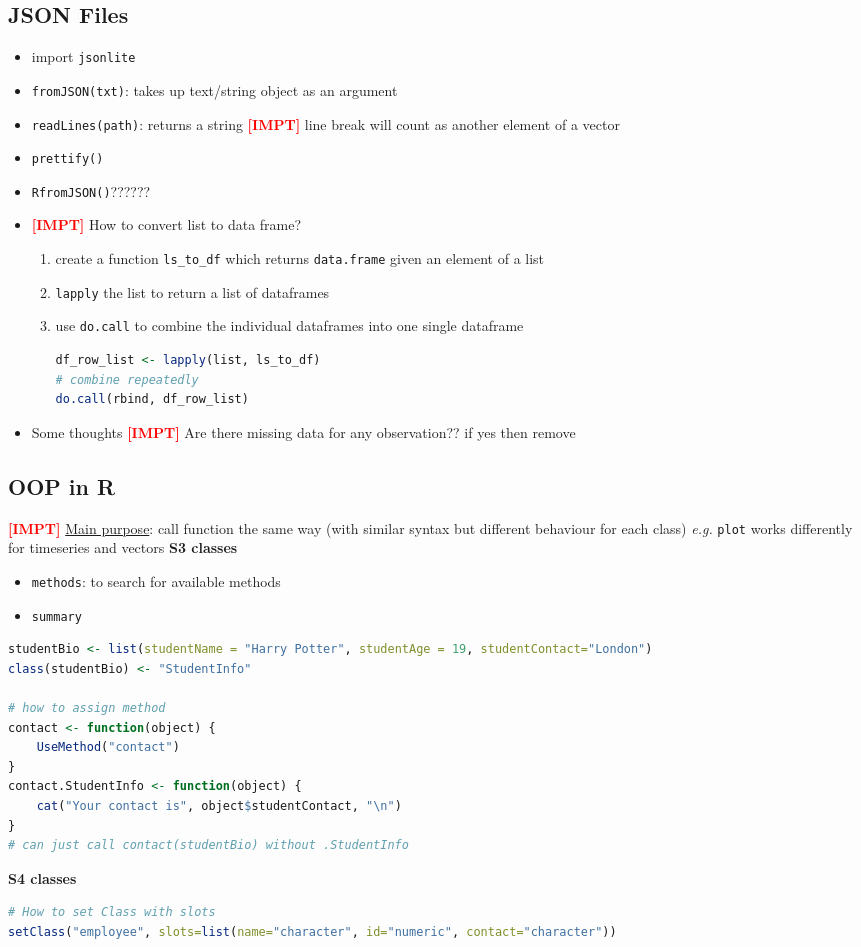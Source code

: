 \documentclass{article}
\newcommand{\eg}[0]{\textit{e.g. }}
\newcommand{\impt}[0]{\textcolor{red}{\textbf{[IMPT] }}}
\begin{document}
\begin{multicols}{2}
\subsection*{JSON Files}
\begin{itemize}
	\item import \texttt{jsonlite}
	\item \texttt{fromJSON(txt)}: takes up text/string object as an argument
	\item \texttt{readLines(path)}: returns a string \impt line break will count as another element of a vector
	\item \texttt{prettify()}
	\item \texttt{RfromJSON()}??????
	\item \impt How to convert list to data frame?
	\begin{enumerate}
		\item create a function \texttt{ls\_to\_df} which returns \texttt{data.frame} given an element of a list
		\item \texttt{lapply} the list to return a list of dataframes
		\item use \texttt{do.call} to combine the individual dataframes into one single dataframe
		\begin{lstlisting}[language=R]
df_row_list <- lapply(list, ls_to_df)
# combine repeatedly
do.call(rbind, df_row_list)\end{lstlisting}
	\end{enumerate}
	\item Some thoughts \impt Are there missing data for any observation?? if yes then remove
\end{itemize}
\subsection{OOP in R}
\impt \underline{Main purpose}: call function the same way (with similar syntax but different behaviour for each class) \eg \texttt{plot} works differently for timeseries and vectors
\textbf{S3 classes}
\begin{itemize}
	\item \texttt{methods}: to search for available methods
	\item \texttt{summary}
\end{itemize}
\begin{lstlisting}[language=R]
studentBio <- list(studentName = "Harry Potter", studentAge = 19, studentContact="London")
class(studentBio) <- "StudentInfo"

# how to assign method
contact <- function(object) {
	UseMethod("contact")
}
contact.StudentInfo <- function(object) {
	cat("Your contact is", object$studentContact, "\n")
}
# can just call contact(studentBio) without .StudentInfo
\end{lstlisting}
\textbf{S4 classes}
\begin{lstlisting}[language=R]
# How to set Class with slots
setClass("employee", slots=list(name="character", id="numeric", contact="character"))


\end{lstlisting}
\end{multicols}
\end{document}
